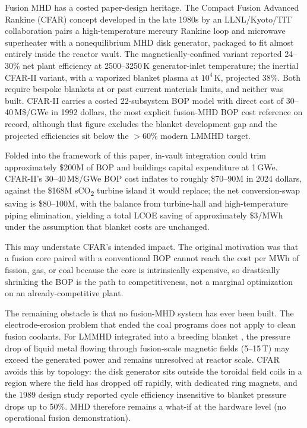 \documentclass{article}
\begin{document}
Fusion MHD has a costed paper-design heritage. The Compact Fusion
Advanced Rankine (CFAR) concept developed in the late 1980s by an
LLNL/Kyoto/TIT collaboration
\citep{HoffmanCampbellLogan1989,Logan1993} pairs a high-temperature
mercury Rankine loop and microwave superheater with a
nonequilibrium MHD disk generator, packaged to fit almost entirely
inside the reactor vault. The magnetically-confined variant reported
24--30\% net plant efficiency at 2500--3250\,K generator-inlet
temperature; the inertial CFAR-II variant, with a vaporized blanket
plasma at $10^4$\,K, projected 38\%. Both require bespoke blankets
at or past current materials limits, and neither was built. CFAR-II
carries a costed 22-subsystem BOP model with direct cost of
30--40\,M\$/GWe in 1992 dollars, the most explicit fusion-MHD BOP
cost reference on record, although that figure excludes the blanket
development gap and the projected efficiencies sit below the
$>$60\% modern LMMHD target.

Folded into the framework of this paper, in-vault integration could
trim approximately \$200M of BOP and buildings capital expenditure
at 1\,GWe. CFAR-II's 30--40\,M\$/GWe BOP cost inflates to roughly
\$70--90M in 2024 dollars, against the \$168M sCO\textsubscript{2}
turbine island it would replace; the net conversion-swap saving is
\$80--100M, with the balance from turbine-hall and high-temperature
piping elimination, yielding a total LCOE saving of approximately
\$3/MWh under the assumption that blanket costs are unchanged.

This may understate CFAR's intended impact. The original motivation
was that a fusion core paired with a conventional BOP cannot reach
the cost per MWh of fission, gas, or coal because the core is
intrinsically expensive, so drastically shrinking the BOP is the
path to competitiveness, not a marginal optimization on an
already-competitive plant.

The remaining obstacle is that no fusion-MHD system has ever been
built. The electrode-erosion problem that ended the coal programs
does not apply to clean fusion coolants. For LMMHD integrated into
a breeding blanket \citep{Smolentsev2022}, the pressure drop of
liquid metal flowing through fusion-scale magnetic fields
(5--15\,T) may exceed the generated power and remains unresolved at
reactor scale. CFAR avoids this by topology: the disk generator
sits outside the toroidal field coils in a region where the field
has dropped off rapidly, with dedicated ring magnets, and the 1989
design study \citep{HoffmanCampbellLogan1989} reported cycle
efficiency insensitive to blanket pressure drops up to 50\%. MHD
therefore remains a what-if at the hardware level (no operational
fusion demonstration).
\end{document}
